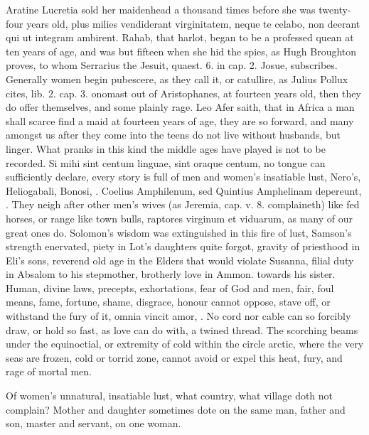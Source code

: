 Aratine Lucretia sold her maidenhead a thousand times before she
was twenty-four years old, plus milies vendiderant virginitatem, \etc{}
neque te celabo, non deerant qui ut integram ambirent. Rahab, that
harlot, began to be a professed quean at ten years of age, and was but
fifteen when she hid the spies, as Hugh Broughton proves, to whom
Serrarius the Jesuit, quaest. 6. in cap. 2. Josue, subscribes.
Generally women begin pubescere, as they call it, or catullire, as
Julius Pollux cites, lib. 2. cap. 3. onomast out of Aristophanes,
at fourteen years old, then they do offer themselves, and some
plainly rage. Leo Afer saith, that in Africa a man shall scarce
find a maid at fourteen years of age, they are so forward, and many
amongst us after they come into the teens do not live without husbands,
but linger. What pranks in this kind the middle ages have played is not
to be recorded. Si mihi sint centum linguae, sint oraque centum, no
tongue can sufficiently declare, every story is full of men and women's
insatiable lust, Nero's, Heliogabali, Bonosi, \etc{}.  Coelius
Amphilenum, sed Quintius Amphelinam depereunt, \etc{}. They neigh after
other men's wives (as Jeremia, cap. v. 8. complaineth) like fed horses,
or range like town bulls, raptores virginum et viduarum, as many of our
great ones do. Solomon's wisdom was extinguished in this fire of lust,
Samson's strength enervated, piety in Lot's daughters quite forgot,
gravity of priesthood in Eli's sons, reverend old age in the Elders
that would violate Susanna, filial duty in Absalom to his stepmother,
brotherly love in Ammon. towards his sister. Human, divine laws,
precepts, exhortations, fear of God and men, fair, foul means, fame,
fortune, shame, disgrace, honour cannot oppose, stave off, or withstand
the fury of it, omnia vincit amor, \etc{}. No cord nor cable can so
forcibly draw, or hold so fast, as love can do with, a twined thread.
The scorching beams under the equinoctial, or extremity of cold within
the circle arctic, where the very seas are frozen, cold or torrid zone,
cannot avoid or expel this heat, fury, and rage of mortal men.

Of women's unnatural, insatiable lust, what country, what village
doth not complain? Mother and daughter sometimes dote on the same man,
father and son, master and servant, on one woman.

